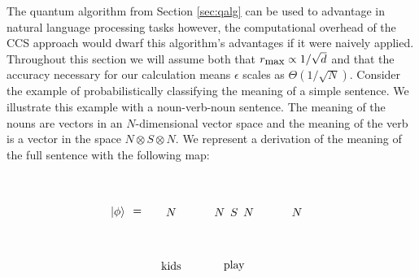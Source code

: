 The quantum algorithm from Section \ref{sec:qalg} can be used to advantage in natural language processing tasks however, the computational overhead of the CCS approach would dwarf this algorithm's advantages if it were naively applied.  
Throughout this section we will assume both that $r_{\small\mbox{max}}\propto 1/\sqrt{d}$ and that the accuracy necessary for our calculation means $\epsilon$ scales as $\Theta(1/\sqrt{N})$. Consider the example of probabilistically classifying the meaning of a  simple sentence. We illustrate this example with a noun-verb-noun sentence. The meaning of the nouns are vectors in an $N$-dimensional vector space and the meaning of the verb is a vector in the space $N\otimes S \otimes N$. We represent a derivation of the meaning of the full sentence with the following map:

\begin{equation}
\label{eqn:phi}
\begin{aligned}
\begin{tikzpicture}[scale=0.6, yscale=-1]
                \node (0) at (-5.5, 0) {\ket{\phi}};
                \node (0) at (-4.5, 0) {=};       
                \node (0) at (-3.5, 1) {};
                \node (1) at (-2, 1) {};
                \node (2) at (-2.75, 2) {};
                \node (3) at (-1, 1) {};
                \node (4) at (2, 1) {};
                \node (5) at (0.5, 2.25) {};
                \node (6) at (4.5, 1) {};
                \node (7) at (3.75, 2) {};
                \node (8) at (3, 1) {};
                \node (9) at (-2.75, 1) {};
                \node (10) at (-0.25, 1) {};
                \node (11) at (0.5, 1) {};
                \node (12) at (1.25, 1) {};
                \node (13) at (3.75, 1) {};
                \node (14) at (-2.75, 0.5) {};
                \node (15) at (-0.25, 0.5) {};
                \node (16) at (0.5, 0.5) {};
                \node (17) at (1.25, 0.5) {};
                \node (18) at (3.75, 0.5) {};
                \node (19) at (-2.75, 0) {$N$};
                \node (20) at (-0.25, 0) {$N$};
                \node (21) at (0.5, 0) {$S$};
                \node (22) at (1.25, 0) {$N$};
                \node (23) at (3.75, 0) {$N$};
                \node (24) at (-2.75, -0.5) {};
                \node (25) at (-0.25, -0.5) {};
                \node (26) at (0.5, -0.5) {};
                \node (27) at (1.25, -0.5) {};
                \node (28) at (3.75, -0.5) {};
                \node (29) at (0.5, -1.75) {};
                \node (30) at (-2.75, 2.75) {kids};
                \node (31) at (0.5, 2.75) {play};

\end{tikzpicture}
\end{aligned}
\end{equation}

